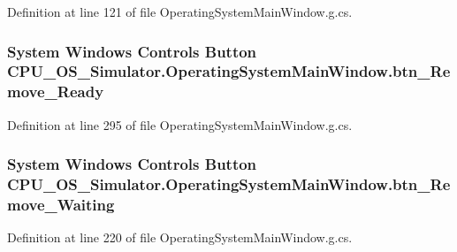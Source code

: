 Definition at line 121 of file Operating\+System\+Main\+Window.\+g.\+cs.

\hypertarget{class_c_p_u___o_s___simulator_1_1_operating_system_main_window_a4ed06428179b1762e9ac112287e2fbc1}{}
\subsubsection[{btn\+\_\+\+Remove\+\_\+\+Ready}]{\setlength{\rightskip}{0pt plus 5cm}System Windows Controls Button C\+P\+U\+\_\+\+O\+S\+\_\+\+Simulator.\+Operating\+System\+Main\+Window.\+btn\+\_\+\+Remove\+\_\+\+Ready\hspace{0.3cm}{\ttfamily [package]}}\label{class_c_p_u___o_s___simulator_1_1_operating_system_main_window_a4ed06428179b1762e9ac112287e2fbc1}


Definition at line 295 of file Operating\+System\+Main\+Window.\+g.\+cs.

\hypertarget{class_c_p_u___o_s___simulator_1_1_operating_system_main_window_a802d545b8ca3b04953277e409aef535f}{}
\subsubsection[{btn\+\_\+\+Remove\+\_\+\+Waiting}]{\setlength{\rightskip}{0pt plus 5cm}System Windows Controls Button C\+P\+U\+\_\+\+O\+S\+\_\+\+Simulator.\+Operating\+System\+Main\+Window.\+btn\+\_\+\+Remove\+\_\+\+Waiting\hspace{0.3cm}{\ttfamily [package]}}\label{class_c_p_u___o_s___simulator_1_1_operating_system_main_window_a802d545b8ca3b04953277e409aef535f}


Definition at line 220 of file Operating\+System\+Main\+Window.\+g.\+cs.


